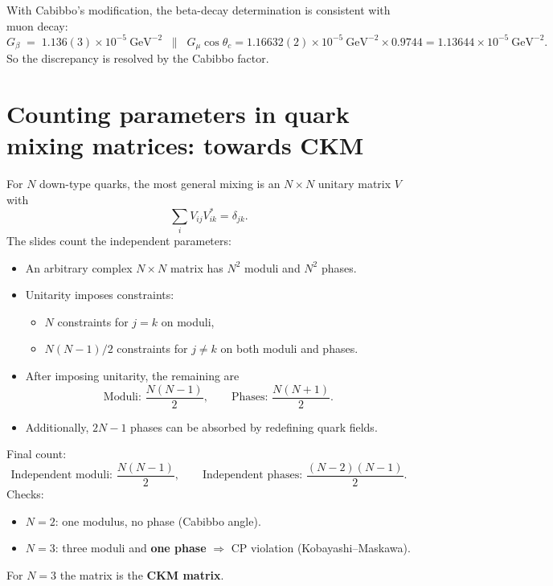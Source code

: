 With Cabibbo's modification, the beta-decay determination is consistent with muon decay:
\begin{equation}
G_{\beta}\;=\;1.136(3)\times 10^{-5}~\text{GeV}^{-2}
\;\;\parallel\;\;
G_{\mu}\cos\theta_c
=
1.16632(2)\times 10^{-5}~\text{GeV}^{-2}\times 0.9744
=
1.13644\times 10^{-5}~\text{GeV}^{-2}.
\end{equation}
So the discrepancy is resolved by the Cabibbo factor.

\section{Counting parameters in quark mixing matrices: towards CKM}
For $N$ down-type quarks, the most general mixing is an $N\times N$ unitary matrix $V$ with
\begin{equation}
\sum_i V_{ij}V^\ast_{ik}=\delta_{jk}.
\end{equation}
The slides count the independent parameters:
\begin{itemize}
  \item An arbitrary complex $N\times N$ matrix has $N^2$ moduli and $N^2$ phases.
  \item Unitarity imposes constraints:
        \begin{itemize}
          \item $N$ constraints for $j=k$ on moduli,
          \item $N(N-1)/2$ constraints for $j\neq k$ on both moduli and phases.
        \end{itemize}
  \item After imposing unitarity, the remaining are
        \begin{equation}
        \text{Moduli: } \frac{N(N-1)}{2},
        \qquad
        \text{Phases: } \frac{N(N+1)}{2}.
        \end{equation}
  \item Additionally, $2N-1$ phases can be absorbed by redefining quark fields.
\end{itemize}
Final count:
\begin{equation}
\boxed{
\text{Independent moduli: }\frac{N(N-1)}{2},
\qquad
\text{Independent phases: }\frac{(N-2)(N-1)}{2}.
}
\end{equation}
Checks:
\begin{itemize}
  \item $N=2$: one modulus, no phase (Cabibbo angle).
  \item $N=3$: three moduli and \textbf{one phase} $\Rightarrow$ CP violation (Kobayashi--Maskawa).
\end{itemize}
For $N=3$ the matrix is the \textbf{CKM matrix}.

